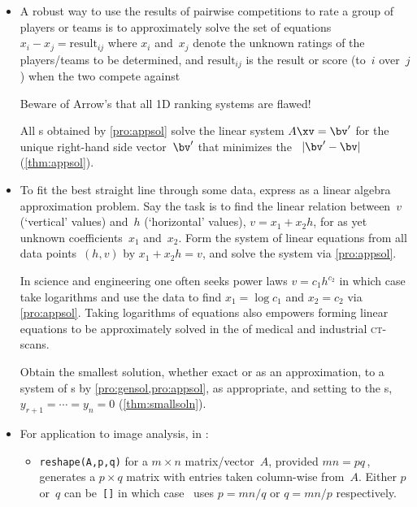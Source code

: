 \begin{itemize}
\item A robust way to use the results of pairwise competitions to rate a group of players or teams is to approximately solve the set of equations \(x_i-x_j=\text{result}_{ij}\) where \(x_i\) and~\(x_j\) denote the unknown ratings of the players\slash teams to be determined, and \(\text{result}_{ij}\) is the result or score (to~\(i\) over~\(j\)) when the two compete against 

Beware of Arrow's  that all 1D ranking systems are flawed!

\itemme All s obtained by \cref{pro:appsol} solve the linear system \(A\xv=\bv'\) for the unique  right-hand side vector~\(\bv'\) that minimizes the ~\(|\bv'-\bv|\) (\cref{thm:appsol}).

\item To fit the best straight line through some data, express as a linear algebra approximation problem.
Say the task is to find the linear relation between~\(v\) (`vertical' values) and~\(h\) (`horizontal' values), \(v=x_1+x_2h\), for as yet unknown coefficients~\(x_1\) and~\(x_2\).
Form the system of linear equations from all data points~\((h,v)\) by \(x_1+x_2h=v\), and solve the system via \cref{pro:appsol}.

In science and engineering one often seeks power laws \(v=c_1h^{c_2}\) in which case take logarithms and use the data to find \(x_1=\log c_1\) and \(x_2=c_2\) via \cref{pro:appsol}.
Taking logarithms of equations also empowers forming linear equations to be approximately solved in the  of medical and industrial \textsc{ct}-scans.


\itemhi Obtain the {smallest solution}, whether exact or as an approximation, to a system of s by \cref{pro:gensol,pro:appsol}, as appropriate, and setting to  the s, \(y_{r+1}=\cdots=y_n=0\) (\cref{thm:smallsoln}).

\item For application to image analysis, in \script:
\begin{itemize}

\item {}\verb|reshape(A,p,q)| for a \(m\times n\) matrix\slash vector~\(A\), provided \(mn=pq\)\,, generates a \(p\times q\) matrix with entries taken column-wise from~\(A\).  
Either \(p\) or~\(q\) can be~\verb|[]| in which case \script\ uses \(p=mn/q\) or \(q=mn/p\) respectively.


\end{itemize}
\end{itemize}
